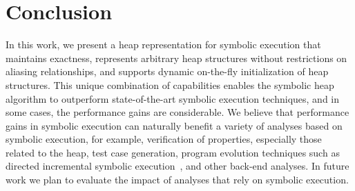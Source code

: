 \section{Conclusion}

In this work, we present a
heap representation for symbolic execution that maintains exactness,
represents arbitrary heap structures without restrictions on aliasing
relationships, and supports dynamic on-the-fly initialization of heap
structures. This unique combination of capabilities enables the
symbolic heap algorithm to outperform state-of-the-art symbolic
execution techniques, and in some cases, the performance gains are
considerable. We believe that performance gains in symbolic execution
can naturally benefit a variety of analyses based on symbolic
execution, for example, verification of properties, especially those
related to the heap, test case generation, program evolution
techniques such as directed incremental symbolic
execution~\cite{person:pldi2011}, and other back-end analyses. In
future work we plan to evaluate the impact of analyses that rely on
symbolic execution.

